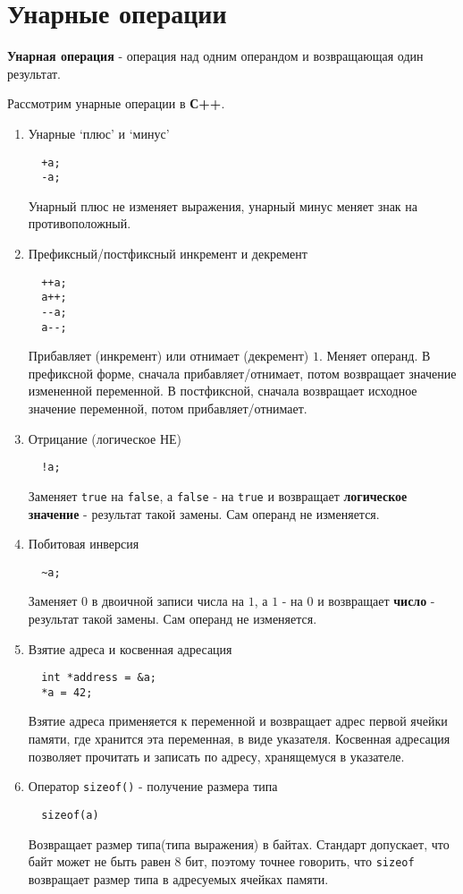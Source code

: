 \section{Унарные
операции}\label{ux443ux43dux430ux440ux43dux44bux435-ux43eux43fux435ux440ux430ux446ux438ux438}

\textbf{Унарная операция} - операция над одним операндом и возвращающая
один результат.

Рассмотрим унарные операции в \textbf{С++}.

\begin{enumerate}
\def\labelenumi{\arabic{enumi})}
\item
  Унарные `плюс' и `минус'
\begin{verbatim}
  +a;
  -a;
\end{verbatim}

  Унарный плюс не изменяет выражения, унарный минус меняет знак на
  противоположный.
\item
  Префиксный/постфиксный инкремент и декремент
\begin{verbatim}
  ++a;
  a++;
  --a;
  a--;
\end{verbatim}

  Прибавляет (инкремент) или отнимает (декремент) \(1\). Меняет операнд.
  В префиксной форме, сначала прибавляет/отнимает, потом возвращает
  значение измененной переменной. В постфиксной, сначала возвращает
  исходное значение переменной, потом прибавляет/отнимает.
\item
  Отрицание (логическое НЕ)
\begin{verbatim}
  !a;
\end{verbatim}

  Заменяет \texttt{true} на \texttt{false}, а \texttt{false} - на
  \texttt{true} и возвращает \textbf{логическое значение} - результат
  такой замены. Сам операнд не изменяется.
\item
  Побитовая инверсия
\begin{verbatim}
  ~a;
\end{verbatim}

  Заменяет \(0\) в двоичной записи числа на \(1\), а \(1\) - на \(0\) и
  возвращает \textbf{число} - результат такой замены. Сам операнд не
  изменяется.
\item
  Взятие адреса и косвенная адресация
\begin{verbatim}
  int *address = &a;
  *a = 42;
\end{verbatim}

  Взятие адреса применяется к переменной и возвращает адрес первой
  ячейки памяти, где хранится эта переменная, в виде указателя.
  Косвенная адресация позволяет прочитать и записать по адресу,
  хранящемуся в указателе.
\item
  Оператор \texttt{sizeof()} - получение размера типа
\begin{verbatim}
  sizeof(a)
\end{verbatim}
  Возвращает размер типа(типа выражения) в байтах. Стандарт допускает,
  что байт может не быть равен 8 бит, поэтому точнее говорить, что
  \texttt{sizeof} возвращает размер типа в адресуемых ячейках памяти.
\end{enumerate}

